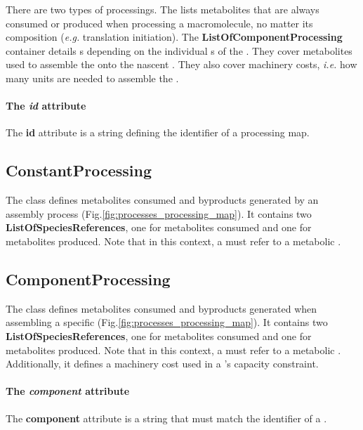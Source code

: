 There are two types of processings.
The \constantprocessing{} lists metabolites that are always consumed or
produced when processing a macromolecule, no matter its composition
(\textit{e.g.} translation initiation).
The \textbf{ListOfComponentProcessing} container details
\componentprocessing{}s depending on the individual
\component{}s of the \macromolecule{}.
They cover metabolites used to assemble the \component{} onto the nascent
\macromolecule{}.
They also cover machinery costs, \textit{i.e.} how many \machinery{} units
are needed to assemble the \component{}.

\paragraph{The \textit{id} attribute}
The \textbf{id} attribute is a string defining the identifier of a
processing map.


\subsection{ConstantProcessing}
\label{sec:constant_processing}

The \constantprocessing{} class defines metabolites consumed and byproducts
generated by an assembly process (Fig.\ref{fig:processes_processing_map}).
It contains two \textbf{ListOfSpeciesReferences}, one for metabolites
consumed and one for metabolites produced.
Note that in this context, a \speciesreference{} must refer to a
metabolic \species.


\subsection{ComponentProcessing}
\label{sec:component_processing}

The \componentprocessing{} class defines metabolites consumed and byproducts
generated when assembling a specific \component{}
(Fig.\ref{fig:processes_processing_map}).
It contains two \textbf{ListOfSpeciesReferences}, one for metabolites
consumed and one for metabolites produced.
Note that in this context, a \speciesreference{} must refer to a
metabolic \species.
Additionally, it defines a machinery cost used in a \machinery{}'s
capacity constraint.

\paragraph{The \textit{component} attribute}
The \textbf{component} attribute is a string that must match the identifier
of a \component{}.

